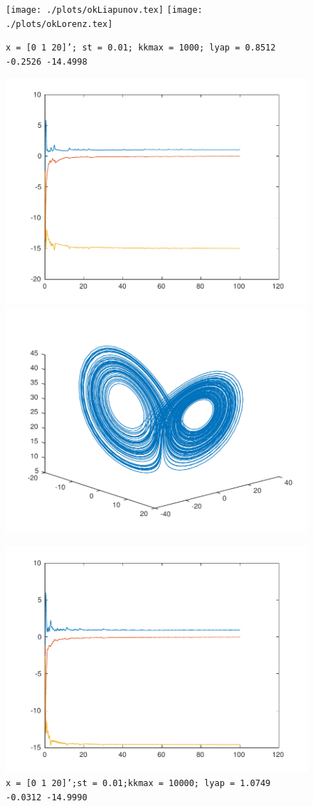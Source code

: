 \begin{figure}
\centering
\texttt{[image: ./plots/okLiapunov.tex]}
\texttt{[image: ./plots/okLorenz.tex]}
\caption{\texttt{x = [0 1 20]'; st = 0.01; kkmax = 1000; lyap = 0.8512   -0.2526  -14.4998}}
\label{fig:comp1}
\includegraphics[scale=0.5]{./plots/goodLiapunov.pdf}
\includegraphics[scale=0.5]{./plots/goodLorenz.pdf}
\caption{\texttt{x = [0 1 20]';st = 0.01;kkmax = 10000;  lyap = 1.0749   -0.0312  -14.9990}}
\label{fig:comp2}
\includegraphics[scale=0.5]{./plots/bestLiapunov.pdf}

\end{figure}
